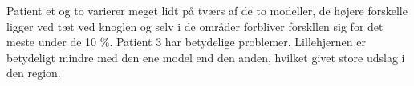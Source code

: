 Patient et og to varierer meget lidt på tværs af de to modeller, de højere
forskelle ligger ved tæt ved knoglen og selv i de områder forbliver
forskllen sig for det meste under de 10 \%. Patient 3 har betydelige
problemer. Lillehjernen er betydeligt mindre med den ene model end den
anden, hvilket givet store udslag i den region. 
